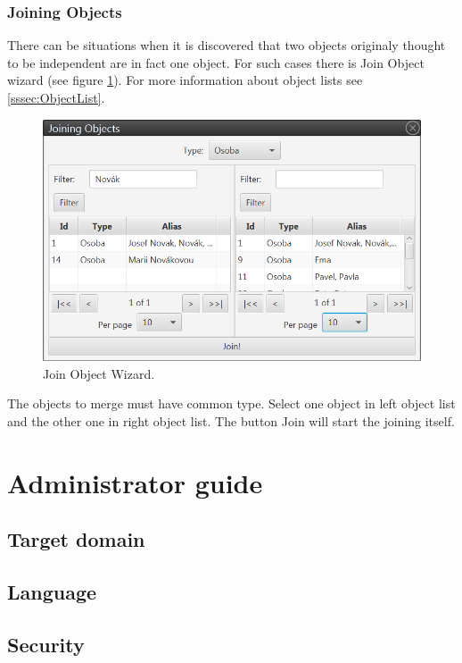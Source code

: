 \documentclass[12pt,a4paper]{report}
\begin{document}
\subsection{Joining Objects}
\label{ssec:JoinObjects}

There can be situations when it is discovered that two objects originaly
thought to be independent are in fact one object. For such cases there is Join
Object wizard (see figure \ref{fig:Join}). For more information about object
lists see \ref{sssec:ObjectList}.

\begin{figure}[!htb]
        \centering
        \includegraphics[width=\textwidth]{Images/join}
        \caption{Join Object Wizard.}
        \label{fig:Join}
\end{figure}

The objects to merge must have common type. Select one object in left object
list and the other one in right object list. The button Join will start the
joining itself.

\chapter{Administrator guide}

\section{Target domain}
\section{Language}
\section{Security}
\label{sec:Security}
\end{document}
